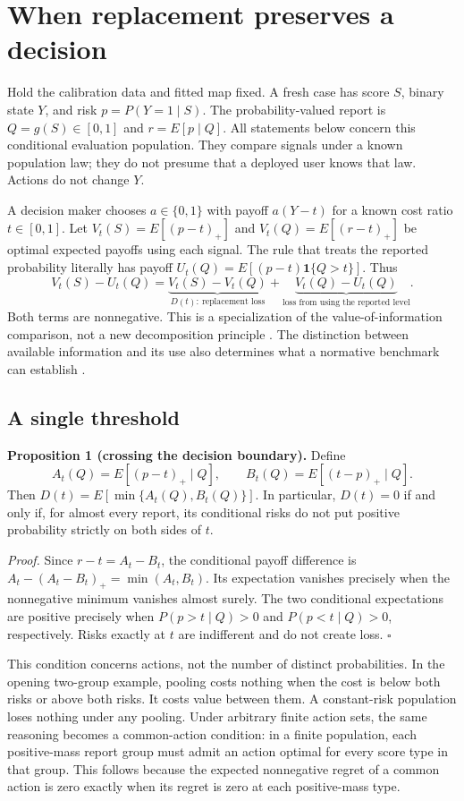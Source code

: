 \section{When replacement preserves a decision}
\label{sec:replacement}
Hold the calibration data and fitted map fixed. A fresh case has score $S$, binary state $Y$, and risk $p=P(Y=1\mid S)$. The probability-valued report is $Q=g(S)\in[0,1]$ and $r=E[p\mid Q]$. All statements below concern this conditional evaluation population. They compare signals under a known population law; they do not presume that a deployed user knows that law. Actions do not change $Y$.

A decision maker chooses $a\in\{0,1\}$ with payoff $a(Y-t)$ for a known cost ratio $t\in[0,1]$. Let $V_t(S)=E[(p-t)_+]$ and $V_t(Q)=E[(r-t)_+]$ be optimal expected payoffs using each signal. The rule that treats the reported probability literally has payoff $U_t(Q)=E[(p-t)\mathbf1\{Q>t\}]$. Thus
\[
V_t(S)-U_t(Q)
=\underbrace{V_t(S)-V_t(Q)}_{D(t):\ \text{replacement loss}}
+\underbrace{V_t(Q)-U_t(Q)}_{\text{loss from using the reported level}}.
\]
Both terms are nonnegative. This is a specialization of the value-of-information comparison, not a new decomposition principle \citep{blackwell1953,tasche,guo2026information}. The distinction between available information and its use also determines what a normative benchmark can establish \citep{hullman2025experiments}.

\subsection{A single threshold}
\textbf{Proposition 1 (crossing the decision boundary).} Define
\[
A_t(Q)=E[(p-t)_+\mid Q],\qquad B_t(Q)=E[(t-p)_+\mid Q].
\]
Then $D(t)=E[\min\{A_t(Q),B_t(Q)\}]$. In particular, $D(t)=0$ if and only if, for almost every report, its conditional risks do not put positive probability strictly on both sides of $t$.

\emph{Proof.} Since $r-t=A_t-B_t$, the conditional payoff difference is
$A_t-(A_t-B_t)_+=\min(A_t,B_t)$. Its expectation vanishes precisely when the nonnegative minimum vanishes almost surely. The two conditional expectations are positive precisely when $P(p>t\mid Q)>0$ and $P(p<t\mid Q)>0$, respectively. Risks exactly at $t$ are indifferent and do not create loss. \hfill$\square$

This condition concerns actions, not the number of distinct probabilities. In the opening two-group example, pooling costs nothing when the cost is below both risks or above both risks. It costs value between them. A constant-risk population loses nothing under any pooling. Under arbitrary finite action sets, the same reasoning becomes a common-action condition: in a finite population, each positive-mass report group must admit an action optimal for every score type in that group. This follows because the expected nonnegative regret of a common action is zero exactly when its regret is zero at each positive-mass type.

